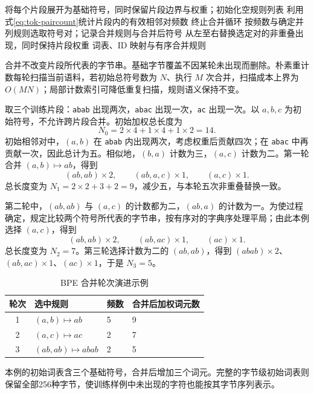 \documentclass[../textbook.tex]{subfiles}
\begin{document}
\begin{algorithm}
\label{alg:tok-bpe}
\begin{myalgorithmic}[1]
\State 将每个片段展开为基础符号，同时保留片段边界与权重；初始化空规则列表
  \State 利用式\eqref{eq:tok-paircount}统计片段内的有效相邻对频数
    \State 终止合并循环
  \Else
    \State 按频数与确定并列规则选取符号对；记录合并规则与合并后符号
      \State 从左至右替换选定对的非重叠出现，同时保持片段权重
    \EndFor
  \EndIf
\EndWhile
\State \Return 词表、ID 映射与有序合并规则
\end{myalgorithmic}
合并不改变片段所代表的字节串。基础字节覆盖不因某轮未出现而删除。朴素重计数每轮扫描当前语料，若初始总符号数为 $N$、执行 $M$ 次合并，扫描成本上界为 $O(MN)$；局部计数索引可降低重复扫描，规则语义保持不变。
\end{algorithm}

\begin{example}
取三个训练片段：\texttt{abab} 出现两次，\texttt{abac} 出现一次，\texttt{ac} 出现一次。以 $a,b,c$ 为初始符号，不允许跨片段合并。初始加权总长度为
\begin{equation*}
 N_0=2\times4+1\times4+1\times2=14.
\end{equation*}
初始相邻对中，$(a,b)$ 在 \texttt{abab} 内出现两次，考虑权重后贡献四次；在 \texttt{abac} 中再贡献一次，因此总计为五。相似地，$(b,a)$ 计数为三，$(a,c)$ 计数为二。第一轮合并 $(a,b)\mapsto ab$，得到
\begin{equation*}
 (ab,ab)\times2,\qquad (ab,a,c)\times1,\qquad(a,c)\times1.
\end{equation*}
总长度变为 $N_1=2\times2+3+2=9$，减少五，与本轮五次非重叠替换一致。

第二轮中，$(ab,ab)$ 与 $(a,c)$ 的计数都为二，$(ab,a)$ 的计数为一。为使过程确定，规定比较两个符号所代表的字节串，按有序对的字典序处理平局；由此本例选择 $(a,c)$，得到
\begin{equation*}
 (ab,ab)\times2,\qquad(ab,ac)\times1,\qquad(ac)\times1.
\end{equation*}
总长度变为 $N_2=7$。第三轮选择计数为二的 $(ab,ab)$，得到 $(abab)\times2$、$(ab,ac)\times1$、$(ac)\times1$，于是 $N_3=5$。

\begin{table}[htbp]
\centering
\caption{BPE 合并轮次演进示例}\label{tab:bpe-rounds}
\begin{tabularx}{\linewidth}{@{}cllX@{}}
\toprule 轮次 & 选中规则 & 频数 & 合并后加权词元数\\\midrule
1 & $(a,b)\mapsto ab$ & 5 & 9\\
2 & $(a,c)\mapsto ac$ & 2 & 7\\
3 & $(ab,ab)\mapsto abab$ & 2 & 5\\
\bottomrule
\end{tabularx}
\end{table}

本例的初始词表含三个基础符号，合并后增加三个词元。完整的字节级初始词表则保留全部256种字节，使训练样例中未出现的字符也能按其字节序列表示。
\end{example}
\end{document}
